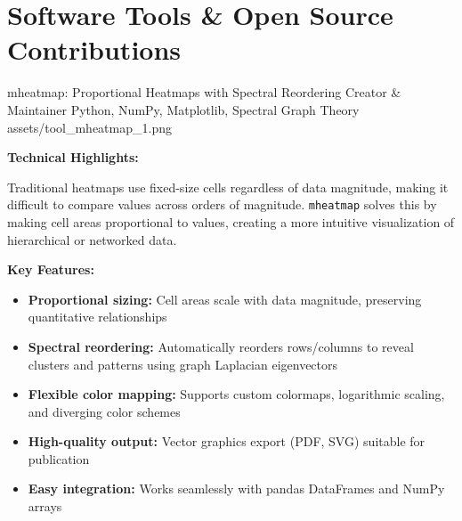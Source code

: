 
\section*{Software Tools \& Open Source Contributions}


\ProjectEntry
{mheatmap: Proportional Heatmaps with Spectral Reordering}
{Creator \& Maintainer}
{Python, NumPy, Matplotlib, Spectral Graph Theory}
{
}
{assets/tool_mheatmap_1.png}
{ \quad {}}
{  }

\vspace{1em}

\textbf{Technical Highlights:}

Traditional heatmaps use fixed-size cells regardless of data magnitude, making it difficult to compare values across orders of magnitude. \texttt{mheatmap} solves this by making cell areas proportional to values, creating a more intuitive visualization of hierarchical or networked data.

\textbf{Key Features:}
\begin{itemize}[leftmargin=1.2em, itemsep=0.1em]
  \item \textbf{Proportional sizing:} Cell areas scale with data magnitude, preserving quantitative relationships
  \item \textbf{Spectral reordering:} Automatically reorders rows/columns to reveal clusters and patterns using graph Laplacian eigenvectors
  \item \textbf{Flexible color mapping:} Supports custom colormaps, logarithmic scaling, and diverging color schemes
  \item \textbf{High-quality output:} Vector graphics export (PDF, SVG) suitable for publication
  \item \textbf{Easy integration:} Works seamlessly with pandas DataFrames and NumPy arrays
\end{itemize}

